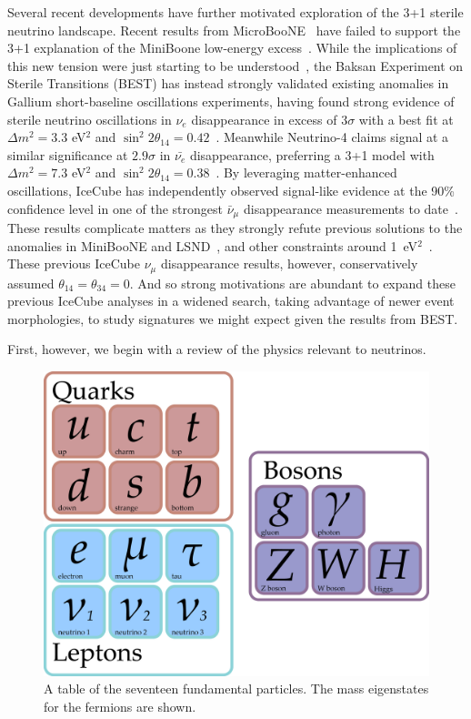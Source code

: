 \documentclass[main.tex]{subfiles}
\begin{document}
Several recent developments have further motivated exploration of the 3+1 sterile neutrino landscape. 
Recent results from MicroBooNE~\cite{microboonecollaboration2021search,microboonecollaboration2021searchmulti} have failed to support the 3+1 explanation of the MiniBoone low-energy excess~\cite{aguilar2018significant}. 
While the implications of this new tension were just starting to be understood~\cite{arguelles2021microboone,denton2021sterile}, the Baksan Experiment on Sterile Transitions (BEST) has instead strongly validated existing anomalies in Gallium short-baseline oscillations experiments, having found strong evidence of sterile neutrino oscillations in $\nu_{e}$ disappearance in excess of $3\sigma$ with a best fit at $\Delta m^{2}=3.3$ eV$^{2}$ and $\sin^{2}2\theta_{14}=0.42$~\cite{barinov2021results, Barinov_2022}. 
Meanwhile Neutrino-4 claims signal at a similar significance at $2.9\sigma$ in $\bar{\nu_{e}}$ disappearance, preferring a 3+1 model with $\Delta m^{2}=7.3$ eV$^{2}$ and $\sin^{2}2\theta_{14}=0.38$~\cite{serebrov2019first}.
By leveraging matter-enhanced oscillations, IceCube has independently observed signal-like evidence at the 90\% confidence level in one of the strongest $\bar{\nu}_{\mu}$ disappearance measurements to date~\cite{Aartsen_2020, Aartsen_2020_prd}.
These results complicate matters as they strongly refute previous solutions to the anomalies in MiniBooNE and LSND~\cite{Athanassopoulos_1998}, and other constraints around 1~eV$^{2}$~\cite{kopp2013sterile, Cirelli:2004cz, abazajian2012light, Gariazzo:2017fdh, Dentler:2017tkw, Diaz:2019fwt}.
These previous IceCube $\nu_{\mu}$ disappearance results, however, conservatively assumed $\theta_{14}=\theta_{34}=0$. 
And so strong motivations are abundant to expand these previous IceCube analyses in a widened search, taking advantage of newer event morphologies, to study signatures we might expect given the results from BEST. 

First, however, we begin with a review of the physics relevant to neutrinos.

\begin{figure}
    \centering
    \includegraphics[width=0.8\linewidth]{figures/particles.png}
    \caption{A table of the seventeen fundamental particles. The mass eigenstates for the fermions are shown.}\label{fig:party}
\end{figure}
\end{document}

